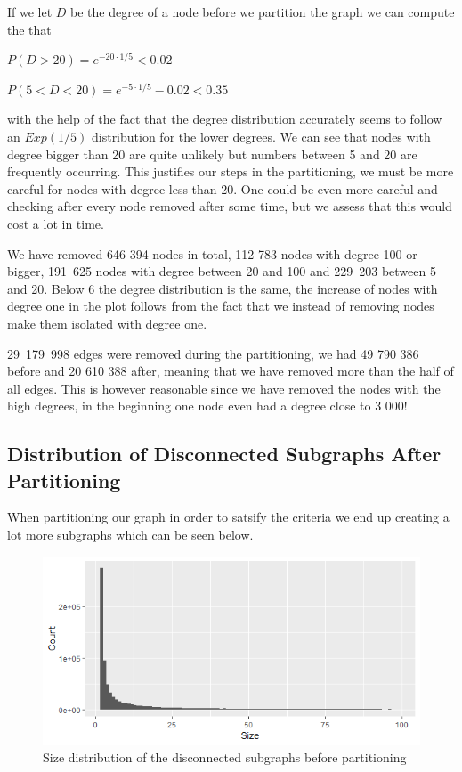 \documentclass[a4paper,10pt]{article}
\begin{document}
If we let $D$ be the degree of a node before we partition the graph we can compute the that

$P(D>20)=e^{-20\cdot 1/5}<0.02$

$P(5<D<20)=e^{-5 \cdot 1/5}-0.02<0.35$

with the help of the fact that the degree distribution accurately seems to follow an $Exp(1/5)$ distribution for the lower degrees. We can see that nodes with degree bigger than 20 are quite unlikely but numbers between 5 and 20 are frequently occurring. This justifies our steps in the partitioning, we must be more careful for nodes with degree less than 20. One could be even more careful and checking after every node removed after some time, but we assess that this would cost a lot in time. 

\medskip

We have removed 646 394 nodes in total, 112 783 nodes with degree 100 or bigger, 191 625‬ nodes with degree between 20 and 100 and 229 203‬ between 5 and 20. Below 6 the degree distribution is the same, the increase of nodes with degree one in the plot follows from the fact that we instead of removing nodes make them isolated with degree one.

\medskip

29 179 998 edges were removed during the partitioning, we had 49 790 386 before and 20 610 388 after, meaning that we have removed more than the half of all edges. This is however reasonable since we have removed the nodes with the high degrees, in the beginning one node even had a degree close to 3 000! 

\subsection{Distribution of Disconnected Subgraphs After Partitioning}

When partitioning our graph in order to satsify the criteria we end up creating a lot more subgraphs which can be seen below.

\begin{figure}[H]
	\centering
	\includegraphics[width=0.85\linewidth]{sizesafter.png}
	\caption{Size distribution of the disconnected subgraphs before partitioning}
	\label{fig:sizeafter}
\end{figure}
\end{document}
